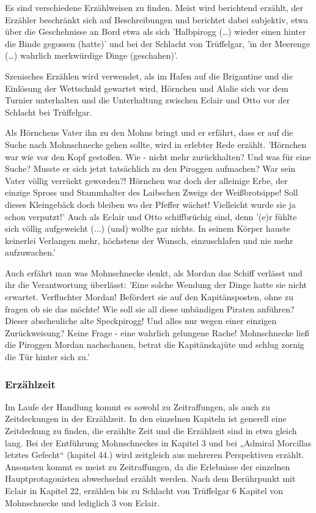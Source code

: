 Es sind verschiedene Erzählweisen zu finden. 
Meist wird berichtend erzählt, der Erzähler beschränkt sich auf Beschreibungen und berichtet dabei subjektiv, etwa über die Geschehnisse an Bord etwa als sich 'Halbpirogg (…) wieder einen hinter die Binde gegossen (hatte)' \cite[S.298]{pir} und bei der Schlacht von Trüffelgar, 'in der Meerenge (…) wahrlich merkwürdige Dinge (geschahen)'.\cite[S.444]{pir} 

Szenisches Erzählen wird verwendet, als im Hafen auf die Brigantine und die Einlösung der Wettschuld gewartet wird,\cite[S.117]{pir} Hörnchen und Alalie sich vor dem Turnier unterhalten\cite[S.340]{pir} und die Unterhaltung zwischen Eclair und Otto vor der Schlacht bei Trüffelgar. \cite[S.414ff]{pir} 

Als Hörnchens Vater ihn zu den Mohns bringt und er erfährt, dass er auf die Suche nach Mohnschnecke gehen sollte, wird in erlebter Rede erzählt.\cite[S.84]{pir} 'Hörnchen war wie vor den Kopf gestoßen. Wie - nicht mehr zurückhalten? Und was für eine Suche? Musste er sich jetzt tatsächlich zu den Piroggen aufmachen? War sein Vater völlig verrückt geworden?! Hörnchen war doch der alleinige Erbe, der einzige Spross und Stammhalter des Laibschen Zweigs der Weißbrotsippe! Soll dieses Kleingebäck doch bleiben wo der Pfeffer wächst! Vielleicht wurde sie ja schon verputzt!'\cite[S.84]{pir}
Auch als Eclair und Otto schiffbrüchig sind,\cite[S.209f]{pir} denn '(e)r fühlte sich völlig aufgeweicht (...) (und) wollte gar nichts. In seinem Körper hauste keinerlei Verlangen mehr, höchstens der Wunsch, einzuschlafen und nie mehr aufzuwachen.'\cite[S.209f]{pir} 

Auch erfährt man was Mohnschnecke denkt, als Mordan das Schiff verlässt und ihr die Verantwortung überlässt: 'Eine solche Wendung der Dinge hatte sie nicht erwartet. Verfluchter Mordan! Befördert sie auf den Kapitänsposten, ohne zu fragen ob sie das möchte! Wie soll sie all diese unbändigen Piraten anführen? Dieser abscheuliche alte Speckpirogg! Und alles nur wegen einer einzigen Zurückweisung? Keine Frage - eine wahrlich gelungene Rache! Mohnschnecke ließ die Piroggen Mordan nachschauen, betrat die Kapitänskajüte und schlug zornig die Tür hinter sich zu.'\cite[S.375]{pir}


\subsubsection{Erzählzeit}

Im Laufe der Handlung kommt es sowohl zu Zeitraffungen, als auch zu Zeitdeckungen in der Erzählzeit. In den einzelnen Kapiteln ist generell eine Zeitdeckung zu finden, die erzählte Zeit und die Erzählzeit sind in etwa gleich lang. Bei der Entführung Mohnschneckes in Kapitel 3 und bei „Admiral Morcillas letztes Gefecht“ (kapitel 44.) wird zeitgleich aus mehreren Perspektiven erzählt. Ansonsten kommt es meist zu Zeitraffungen, da die Erlebnisse der einzelnen Hauptprotagonisten abwechselnd erzählt werden.  Nach dem Berührpunkt mit Eclair in Kapitel 22, erzählen bis zu Schlacht von Trüffelgar 6 Kapitel von Mohnschnecke und lediglich 3 von Eclair.

